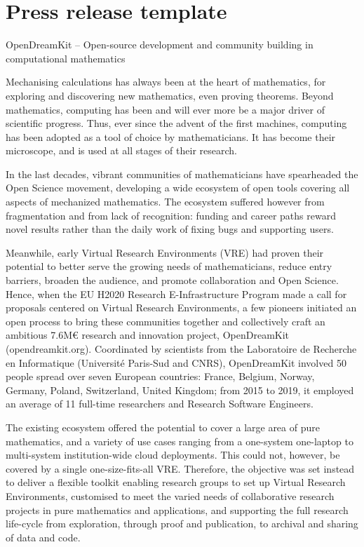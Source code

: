\section{Press release template}

OpenDreamKit – Open-source development and community building in computational mathematics

Mechanising calculations has always been at the heart of mathematics, for exploring and discovering new mathematics,
even proving theorems. Beyond mathematics, computing has been and will ever more be a major driver of scientific progress. 
Thus, ever since the advent of the first machines, computing has been adopted as a tool of choice by mathematicians. 
It has become their microscope, and is used at all stages of their research.

In the last decades, vibrant communities of mathematicians have spearheaded the Open Science movement, developing a 
wide ecosystem of open tools covering all aspects of mechanized mathematics. The ecosystem suffered however from 
fragmentation and from lack of recognition: funding and career paths reward novel results rather than the daily work 
of fixing bugs and supporting users.

Meanwhile, early Virtual Research Environments (VRE) had proven their potential to better serve the growing needs of
mathematicians, reduce entry barriers, broaden the audience, and promote collaboration and Open Science. Hence, when 
the EU H2020 Research E-Infrastructure Program made a call for proposals centered on Virtual Research Environments, a 
few pioneers initiated an open process to bring these communities together and collectively craft an ambitious 7.6M€ 
research and innovation project, OpenDreamKit (opendreamkit.org). Coordinated by scientists from the Laboratoire de 
Recherche en Informatique (Université Paris-Sud and CNRS), OpenDreamKit involved 50 people spread over seven European
 countries: France, Belgium, Norway, Germany, Poland, Switzerland, United Kingdom; from 2015 to 2019, it employed an 
average of 11 full-time researchers and Research Software Engineers.

The existing ecosystem offered the potential to cover a large area of pure mathematics, and a variety of use cases 
ranging from a one-system one-laptop to multi-system institution-wide cloud deployments. This could not, however, 
be covered by a single one-size-fits-all VRE. Therefore, the objective was set instead to deliver a flexible toolkit
enabling research groups to set up Virtual Research Environments, customised to meet the varied needs of collaborative 
research projects in pure mathematics and applications, and supporting the full research life-cycle from exploration, 
through proof and publication, to archival and sharing of data and code.


